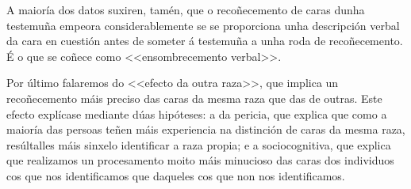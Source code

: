 \documentclass[a4paper,11pt]{article}
\begin{document}
A maioría dos datos suxiren, tamén, que o recoñecemento de caras dunha testemuña empeora considerablemente se se proporciona unha descripción verbal da cara en cuestión antes de someter á testemuña a unha roda de recoñecemento. É o que se coñece como <<ensombrecemento verbal>>.

Por último falaremos do <<efecto da outra raza>>, que implica un recoñecemento máis preciso das caras da mesma raza que das de outras. Este efecto explícase mediante dúas hipóteses: a da pericia, que explica que como a maioría das persoas teñen máis experiencia na distinción de caras da mesma raza, resúltalles máis sinxelo identificar a raza propia; e a sociocognitiva, que explica que realizamos un procesamento moito máis minucioso das caras dos individuos cos que nos identificamos que daqueles cos que non nos identificamos.
\end{document}
